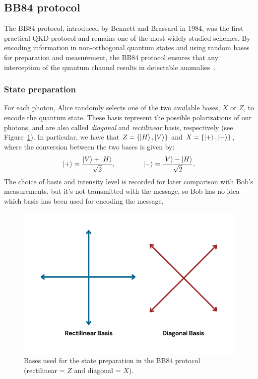 \documentclass[prl,twocolumn]{revtex4-1}
\begin{document}
\subsection{BB84 protocol}
The BB84 protocol, introduced by Bennett and Brassard in 1984, was the first practical QKD protocol and remains one of the most widely studied schemes. By encoding information in non-orthogonal quantum states and using random bases for preparation and measurement, the BB84 protocol ensures that any interception of the quantum channel results in detectable anomalies~\cite{pap1}.

\subsubsection{State preparation}
For each photon, Alice randomly selects one of the two available bases, $X$ or $Z$, to encode the quantum state. These basis represent the possible polarizations of our photons, and are also called \textit{diagonal} and \textit{rectilinear} basis, respectively (see Figure~\ref{fig:basis_2}). In particular, we have that $Z = \{ \ket H, \ket V\}$ and $X = \{ \ket+, \ket-\}$, where the conversion between the two bases is given by:
%
\begin{equation}
    \ket + =\frac{\ket V + \ket H}{\sqrt{2}}, \qquad \qquad \ket - =\frac{\ket V - \ket H}{\sqrt{2}}.
\end{equation}
%
The choice of basis and intensity level is recorded for later comparison with Bob's measurements, but it's not transmitted with the message, so Bob has no idea which basis has been used for encoding the message.


\begin{figure}
    \centering
    \includegraphics[width=\linewidth]{Images/basis (2).png}
    \caption{Bases used for the state preparation in the BB84 protocol (rectilinear = $Z$ and diagonal = $X$).}
    \label{fig:basis_2}
\end{figure}
\end{document}
